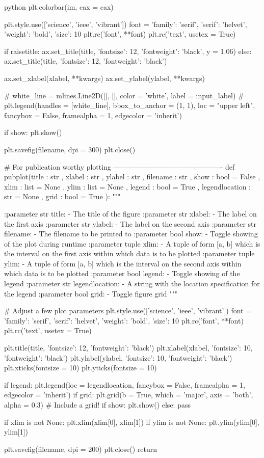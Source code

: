 \documentclass[../main.tex]{subfiles}
\begin{document}
\begin{mintedbox}{python}
plt.colorbar(im, cax = cax)

plt.style.use(['science', 'ieee', 'vibrant'])
font  =  {'family': 'serif',
	'serif': 'helvet',
	'weight': 'bold',
	'size': 10}
plt.rc('font', **font)
plt.rc('text', usetex  =  True)

if raisetitle:
ax.set_title(title, {'fontsize': 12, 'fontweight': 'black'},  y  =  1.06)
else:
ax.set_title(title, {'fontsize': 12, 'fontweight': 'black'})

ax.set_xlabel(xlabel, **kwargs)
ax.set_ylabel(ylabel, **kwargs)

# white_line   =   mlines.Line2D([], [], color  =  'white', label  =  input_label)
# plt.legend(handles  =  [white_line], bbox_to_anchor  =  (1, 1), loc  =  "upper left", fancybox  =  False, framealpha  =  1, edgecolor  =  'inherit')

if show:
plt.show()

plt.savefig(filename, dpi  =  300)
plt.close()


# For publication worthy plotting ----------------------------------------------
def pubplot(title           : str           ,
xlabel          : str           ,
ylabel          : str           ,
filename        : str           ,
show            : bool    =   False ,
xlim            : list    =   None  ,
ylim            : list    =   None  ,
legend          : bool    =   True  ,
legendlocation  : str     =   None  ,
grid            : bool    =   True   ):
"""

:parameter str title:
- The title of the figure
:parameter str xlabel:
- The label on the first axis
:parameter str ylabel:
- The label on the second axis
:parameter str filename:
- The filename to be printed to
:parameter bool show:
- Toggle showing of the plot during runtime
:parameter tuple xlim:
- A tuple of form [a, b] which is the interval on the first axis
within which data is to be plotted
:parameter tuple ylim:
- A tuple of form [a, b] which is the interval on the second axis
within which data is to be plotted
:parameter bool legend:
- Toggle showing of the legend
:parameter str legendlocation:
- A string with the location specification for the legend
:parameter bool grid:
- Toggle figure grid
"""

# Adjust a few plot parameters
plt.style.use(['science', 'ieee', 'vibrant'])
font   =   {'family': 'serif',
	'serif': 'helvet',
	'weight': 'bold',
	'size': 10}
plt.rc('font', **font)
plt.rc('text', usetex  =  True)

plt.title(title, {'fontsize': 12, 'fontweight': 'black'})
plt.xlabel(xlabel, {'fontsize': 10, 'fontweight': 'black'})
plt.ylabel(ylabel, {'fontsize': 10, 'fontweight': 'black'})
plt.xticks(fontsize  =  10)
plt.yticks(fontsize  =  10)

if legend:
plt.legend(loc  =  legendlocation, fancybox  =  False, framealpha  =  1, edgecolor  =  'inherit')
if grid:
plt.grid(b  =  True, which  =  'major', axis  =  'both', alpha  =  0.3)  # Include a grid!
if show:
plt.show()
else:
pass

if xlim is not None:
plt.xlim(xlim[0], xlim[1])
if ylim is not None:
plt.ylim(ylim[0], ylim[1])

plt.savefig(filename, dpi  =  200)
plt.close()
return
\end{mintedbox}
\end{document}

